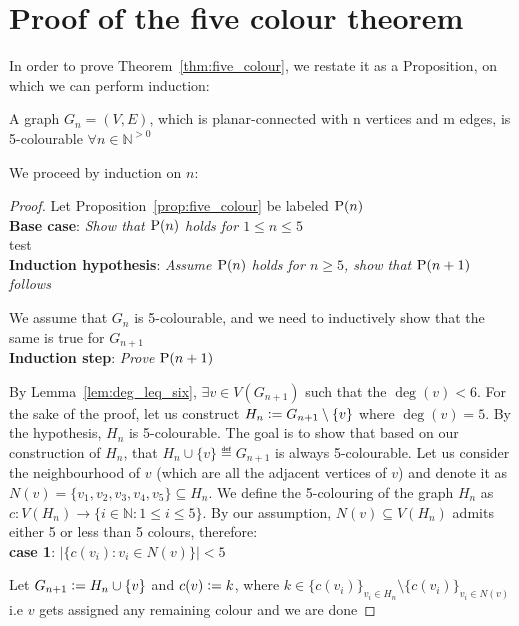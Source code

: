 \section{Proof of the five colour theorem}
In order to prove Theorem~\ref{thm:five_colour}, we restate it as a Proposition, on which we can perform induction:
\begin{proposition}
\label{prop:five_colour}
A graph $G_n = (V, E)$, which is planar-connected with n vertices and m edges, is 5-colourable $\forall n \in \mathbb{N}^{>0}$
\end{proposition}

We proceed by induction on $n$:
\begin{proof} Let Proposition~\ref{prop:five_colour} be labeled $\mathrm{P}(n)$ \vspace{.1cm} \\
\textbf{Base case}: \textit{Show that $\mathrm{P}(n)$ holds for $1 \leq n \leq 5$} \\
test \vspace{.1cm} \\
\textbf{Induction hypothesis}: \textit{Assume $\mathrm{P}(n)$ holds for $n \geq 5$, show that $\mathrm{P}(n + 1)$ follows} \vspace{.1cm}

We assume that $G_{n}$ is 5-colourable, and we need to inductively show that the same is true for $G_{n + 1}$ \vspace{.1cm} \\
\textbf{Induction step}: \textit{Prove $\mathrm{P}(n + 1)$} \vspace{.1cm}

By Lemma~\ref{lem:deg_leq_six}, $\exists v \in V(G_{n + 1})$ such that the $\deg(v) < 6$. For the sake of the proof, let us construct $H_{n} \vcentcolon= G_{n + 1} \setminus \{v\}$ where $\deg(v) = 5$. By the hypothesis, $H_{n}$ is 5-colourable. The goal is to show that based on our construction of $H_{n}$, that $H_{n} \cup \{v\} \eqdef G_{n + 1}$ is always 5-colourable. Let us consider the neighbourhood of $v$ (which are all the adjacent vertices of $v$) and denote it as $N(v) = \{v_1, v_2, v_3, v_4, v_5\} \subseteq H_{n}$. We define the 5-colouring of the graph $H_n$ as $c : V(H_{n}) \longrightarrow \{i \in \mathbb{N} : 1 \leq i \leq 5\}$. By our assumption, $N(v) \subseteq V(H_{n})$ admits either 5 or less than 5 colours, therefore: \\
\textbf{case 1}: $|\{c(v_{i}) : v_{i} \in N(v)\}| < 5$

Let $G_{n + 1} \vcentcolon= H_{n} \cup \{v\}$ and $c(v) \vcentcolon= k$, where $k \in \{ c(v_{i}) \}_{v_{i} \in H_{n}} \setminus \{ c(v_{i}) \}_{v_{i} \in N(v)}$ i.e $v$ gets assigned any remaining colour and we are done


\end{proof}
